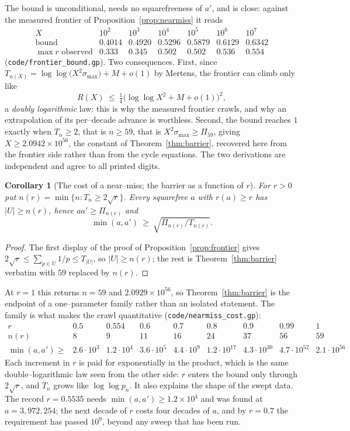 \documentclass[11pt]{article}
\newtheorem{corollary}[theorem]{Corollary}
\theoremstyle{definition}
\begin{document}
The bound is unconditional, needs no squarefreeness of $a'$, and is close: against the measured
frontier of Proposition~\ref{prop:nearmiss} it reads
\[
\begin{array}{l|cccccc}
X & 10^{2} & 10^{3} & 10^{4} & 10^{5} & 10^{6} & 10^{7}\\\hline
\text{bound} & 0.4014 & 0.4920 & 0.5296 & 0.5879 & 0.6129 & 0.6342\\
\max r \text{ observed} & 0.333 & 0.345 & 0.502 & 0.502 & 0.536 & 0.554
\end{array}
\]
\textup{(\texttt{code/frontier\_bound.gp})}. Two consequences. First, since
$T_{n(X)}=\log\log\bigl(X^{2}\sigma_{\max}\bigr)+M+o(1)$ by Mertens, the frontier can climb only like
\[ R(X)\ \le\ \tfrac14\bigl(\log\log X^{2}+M+o(1)\bigr)^{2}, \]
a \emph{doubly logarithmic} law: this is why the measured frontier crawls, and why an extrapolation
of its per--decade advance is worthless. Second, the bound reaches $1$ exactly when $T_{n}\ge2$, that
is $n\ge59$, that is $X^{2}\sigma_{\max}\ge\Pi_{59}$, giving $X\ge2.0942\times10^{56}$, the
constant of Theorem~\ref{thm:barrier}, recovered here from the frontier side rather than from the
cycle equations. The two derivations are independent and agree to all printed digits.

\begin{corollary}[The cost of a near--miss; the barrier as a function of $r$]\label{cor:cost}
For $r>0$ put $n(r)=\min\{n:T_n\ge2\sqrt r\}$. Every squarefree $a$ with $r(a)\ge r$ has
$|U|\ge n(r)$, hence $aa'\ge\Pi_{n(r)}$ and
\[ \min(a,a')\ \ge\ \sqrt{\Pi_{n(r)}/T_{n(r)}}. \]
\end{corollary}
\begin{proof}
The first display of the proof of Proposition~\ref{prop:frontier} gives $2\sqrt r\le\sum_{p\in U}1/p
\le T_{|U|}$, so $|U|\ge n(r)$; the rest is Theorem~\ref{thm:barrier} verbatim with $59$ replaced by
$n(r)$.
\end{proof}

At $r=1$ this returns $n=59$ and $2.0929\times10^{56}$, so Theorem~\ref{thm:barrier} is the endpoint
of a one--parameter family rather than an isolated statement. The family is what makes the crawl
quantitative \textup{(\texttt{code/nearmiss\_cost.gp})}:
\[
\begin{array}{l|cccccccc}
r & 0.5 & 0.554 & 0.6 & 0.7 & 0.8 & 0.9 & 0.99 & 1\\\hline
n(r) & 8 & 9 & 11 & 16 & 24 & 37 & 56 & 59\\
\min(a,a')\ge & 2.6\!\cdot\!10^{3} & 1.2\!\cdot\!10^{4} & 3.6\!\cdot\!10^{5} & 4.4\!\cdot\!10^{9} &
 1.2\!\cdot\!10^{17} & 4.3\!\cdot\!10^{30} & 4.7\!\cdot\!10^{52} & 2.1\!\cdot\!10^{56}
\end{array}
\]
Each increment in $r$ is paid for exponentially in the product, which is the same double--logarithmic
law seen from the other side: $r$ enters the bound only through $2\sqrt r$, and $T_n$ grows like
$\log\log p_n$. It also explains the shape of the swept data. The record $r=0.5535$ needs
$\min(a,a')\ge1.2\times10^{4}$ and was found at $a=3{,}972{,}254$; the next decade of $r$ costs four
decades of $a$, and by $r=0.7$ the requirement has passed $10^{9}$, beyond any sweep that has been
run.
\end{document}
